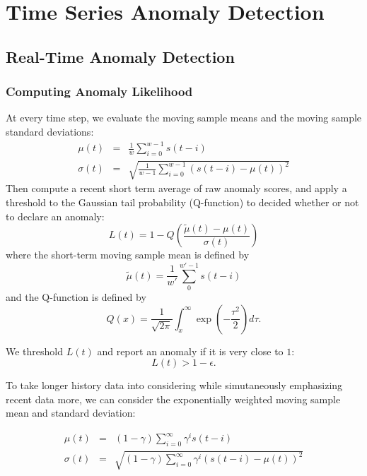\documentclass[10pt, twoside]{book}   	%
\begin{document}
\chapter{Time Series Anomaly Detection}

\section{Real-Time Anomaly Detection}

\subsection{Computing Anomaly Likelihood}



At every time step, we evaluate the moving sample means and the moving sample standard deviations:
\begin{eqnarray}
\mu(t) &=& \frac{1}{w} \sum_{i=0}^{w-1} s(t-i)
\\
\sigma(t) &=& \sqrt{\frac{1}{w-1} \sum_{i=0}^{w-1} (s(t-i)-\mu(t))^2}
\end{eqnarray}
Then compute a recent short term average of raw anomaly scores,
and apply a threshold to the Gaussian tail probability (Q-function)
to decided whether or not to declare an anomaly:
\begin{equation}
L(t) = 1 - Q\left(\frac{\tilde{\mu}(t) - \mu(t)}{\sigma(t)}\right)
\end{equation}
where the short-term moving sample mean is defined by
\begin{equation}
\tilde{\mu}(t) = \frac{1}{w'} \sum_{0}^{w'-1} s(t-i)
\end{equation}
and the Q-function is defined by
\begin{equation}
Q(x) = \frac{1}{\sqrt{2\pi}} \int_x^\infty \exp\left(-\frac{\tau^2}{2}\right)  d \tau.
\end{equation}

We threshold $L(t)$ and report an anomaly if it is very close to $1$:
\begin{equation}
L(t) > 1 - \epsilon.
\end{equation}



To take longer history data into considering while simutaneously emphasizing recent data more,
we can consider the exponentially weighted moving sample mean and standard deviation:

\begin{eqnarray}
\mu(t) &=& (1-\gamma) \sum_{i=0}^{\infty} \gamma^i s(t-i)
\\
\sigma(t) &=& \sqrt{(1-\gamma) \sum_{i=0}^{\infty} \gamma^i (s(t-i)-\mu(t))^2}
\end{eqnarray}
\end{document}
